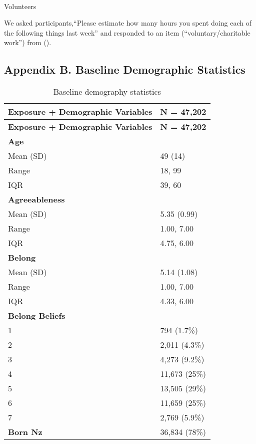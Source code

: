 \documentclass[
  singlecolumn]{article}
\makeatletter
\let\oldparagraph\paragraph
\renewcommand{\paragraph}{
    \@ifstar
      \xxxParagraphStar
      \xxxParagraphNoStar
  }
\newcommand{\xxxParagraphStar}[1]{\oldparagraph*{#1}\mbox{}}
\newcommand{\xxxParagraphNoStar}[1]{\oldparagraph{#1}\mbox{}}
\makeatother
\begin{document}
\paragraph{Volunteers}\label{volunteers}

We asked participants,``Please estimate how many hours you spent doing
each of the following things last week'' and responded to an item
(``voluntary/charitable work'') from ().

\subsection{Appendix B. Baseline Demographic
Statistics}\label{appendix-demographics}

\begin{longtable}[]{@{}ll@{}}
\caption{Baseline demography
statistics}\label{tbl-table-demography}\tabularnewline
\toprule\noalign{}
\textbf{Exposure + Demographic Variables} & \textbf{N = 47,202} \\
\midrule\noalign{}
\endfirsthead
\toprule\noalign{}
\textbf{Exposure + Demographic Variables} & \textbf{N = 47,202} \\
\midrule\noalign{}
\endhead
\bottomrule\noalign{}
\endlastfoot
\textbf{Age} & \\
Mean (SD) & 49 (14) \\
Range & 18, 99 \\
IQR & 39, 60 \\
\textbf{Agreeableness} & \\
Mean (SD) & 5.35 (0.99) \\
Range & 1.00, 7.00 \\
IQR & 4.75, 6.00 \\
\textbf{Belong} & \\
Mean (SD) & 5.14 (1.08) \\
Range & 1.00, 7.00 \\
IQR & 4.33, 6.00 \\
\textbf{Belong Beliefs} & \\
1 & 794 (1.7\%) \\
2 & 2,011 (4.3\%) \\
3 & 4,273 (9.2\%) \\
4 & 11,673 (25\%) \\
5 & 13,505 (29\%) \\
6 & 11,659 (25\%) \\
7 & 2,769 (5.9\%) \\
\textbf{Born Nz} & 36,834 (78\%) \\

\end{longtable}
\end{document}
